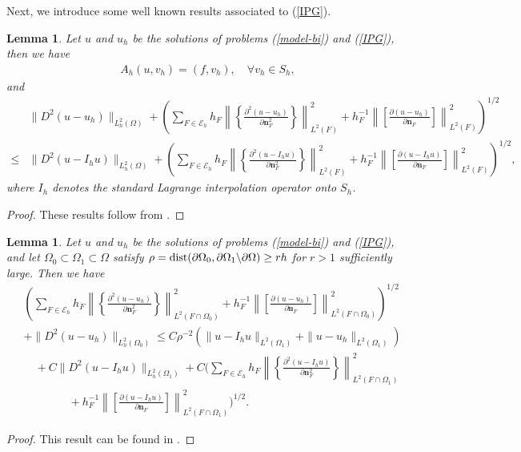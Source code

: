 \documentclass[1996/10/24]{amsart}
\newtheorem{lemma}[theorem]{Lemma}
\theoremstyle{definition}
\numberwithin{equation}{section}
\begin{document}
Next, we introduce some well known results associated to (\ref{IPG}).
\begin{lemma}\label{dfp-bi}
Let $u$ and $u_h$ be the solutions of problems (\ref{model-bi}) and (\ref{IPG}), then we have
\begin{align}
A_h(u,v_h)=(f,v_h),\quad \forall v_h\in S_h,
\end{align}
and
\begin{align}
&\|D^2(u-u_h)\|_{L_h^2(\Omega)}+\left(\sum_{F\in\mathcal{E}_h}h_F\left\|\left\{\frac{\partial^2(u-u_h)}{\partial{\bm n}_F^2}\right\}\right\|^2_{L^2(F)}
+h_F^{-1}\left\|\left[\frac{\partial(u-u_h)}{\partial{\bm n}_F}\right]\right\|^2_{L^2(F)}\right)^{1/2}\\
\leq&\|D^2(u-I_hu)\|_{L_h^2(\Omega)}+\left(\sum_{F\in\mathcal{E}_h}h_F\left\|\left\{\frac{\partial^2(u-I_hu)}{\partial{\bm n}_F^2}\right\}\right\|^2_{L^2(F)}
+h_F^{-1}\left\|\left[\frac{\partial(u-I_hu)}{\partial{\bm n}_F}\right]\right\|^2_{L^2(F)}\right)^{1/2},\nonumber
\end{align}
where $I_h$ denotes the standard Lagrange interpolation operator onto $S_h$.
\end{lemma}
\begin{proof}
These results follow from \cite[Lemma 5 and Lemma 8]{bs2005}.
\end{proof}
\begin{lemma}\label{lee-bi}
Let $u$ and $u_h$ be the solutions of problems (\ref{model-bi}) and (\ref{IPG}), and let $\Omega_0\subset\Omega_1\subset\Omega$ satisfy
$\rho={\rm dist}(\partial\Omega_0,\partial\Omega_1\backslash\partial\Omega)\geq rh$ for $r>1$ sufficiently large. Then we have
\begin{align}
&\left(\sum_{F\in\mathcal{E}_h}h_F\left\|\left\{\frac{\partial^2(u-u_h)}{\partial{\bm n}_F^2}\right\}\right\|^2_{L^2(F\cap\Omega_0)}
+h_F^{-1}\left\|\left[\frac{\partial(u-u_h)}{\partial{\bm n}_F}\right]\right\|^2_{L^2(F\cap\Omega_0)}\right)^{1/2}\nonumber\\
&+\|D^2(u-u_h)\|_{L^2_h(\Omega_0)}\leq C\rho^{-2}\left(\|u-I_hu\|_{L^2(\Omega_1)}+\|u-u_h\|_{L^2(\Omega_1)}\right)\\
&\quad+ C\|D^2(u-I_hu)\|_{L^2_h(\Omega_1)}+C\Big(\sum_{F\in\mathcal{E}_h}h_F\left\|\left\{\frac{\partial^2(u-I_hu)}{\partial{\bm n}_F^2}\right\}\right\|^2_{L^2(F\cap\Omega_1)}\nonumber\\
&\quad \quad\quad\quad+h_F^{-1}\left\|\left[\frac{\partial(u-I_hu)}{\partial{\bm n}_F}\right]\right\|^2_{L^2(F\cap\Omega_1)}\Big)^{1/2}.\nonumber
\end{align}
\end{lemma}
\begin{proof}
This result can be found in \cite[Lemma 3.9]{l2021}.
\end{proof}
\end{document}
